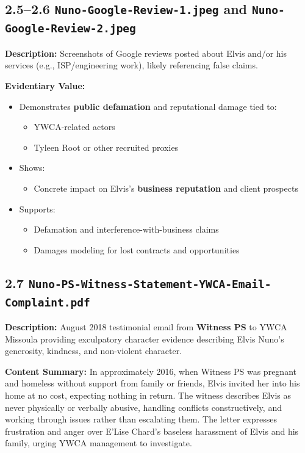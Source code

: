 \documentclass[11pt, letterpaper]{article}
\begin{document}
\subsection{2.5--2.6 \texttt{Nuno-Google-Review-1.jpeg} and \texttt{Nuno-Google-Review-2.jpeg}}

\textbf{Description:} Screenshots of Google reviews posted about Elvis and/or his services (e.g., ISP/engineering work), likely referencing false claims.

\textbf{Evidentiary Value:}

\begin{itemize}[leftmargin=*]
  \item Demonstrates \textbf{public defamation} and reputational damage tied to:
    \begin{itemize}
      \item YWCA-related actors
      \item Tyleen Root or other recruited proxies
    \end{itemize}
  \item Shows:
    \begin{itemize}
      \item Concrete impact on Elvis's \textbf{business reputation} and client prospects
    \end{itemize}
  \item Supports:
    \begin{itemize}
      \item Defamation and interference-with-business claims
      \item Damages modeling for lost contracts and opportunities
    \end{itemize}
\end{itemize}

\subsection{2.7 \texttt{Nuno-PS-Witness-Statement-YWCA-Email-Complaint.pdf}}

\textbf{Description:} August 2018 testimonial email from \textbf{Witness PS} to YWCA Missoula providing exculpatory character evidence describing Elvis Nuno's generosity, kindness, and non-violent character.

\textbf{Content Summary:} In approximately 2016, when Witness PS was pregnant and homeless without support from family or friends, Elvis invited her into his home at no cost, expecting nothing in return. The witness describes Elvis as never physically or verbally abusive, handling conflicts constructively, and working through issues rather than escalating them. The letter expresses frustration and anger over E'Lise Chard's baseless harassment of Elvis and his family, urging YWCA management to investigate.
\end{document}
